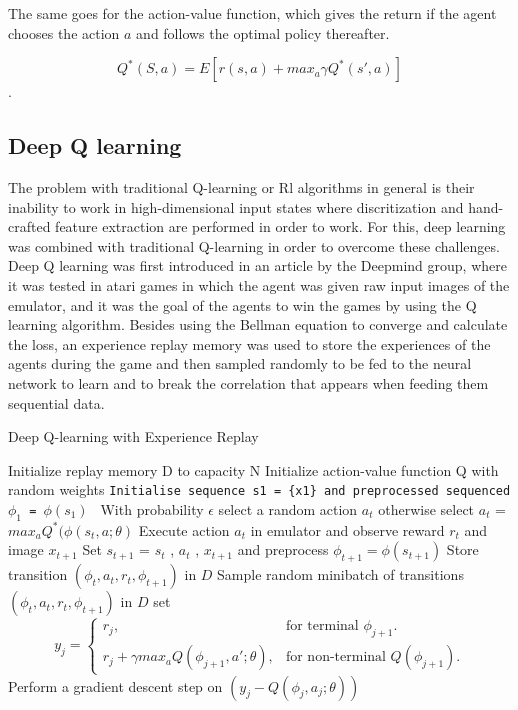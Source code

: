 \documentclass[12pt]{extarticle}
\begin{document}
The same goes for the action-value function, which gives the return if the agent chooses the action $a$ and follows the optimal policy thereafter.

\[ Q^{*}(S,a)=E[r(s,a)+max_{a}\gamma Q^{*}(s',a) ] \]\cite{watkins1992q}.


\pagebreak

\subsection{Deep Q learning}
The problem with traditional Q-learning or Rl algorithms in general is their inability to work in high-dimensional input states where discritization and hand-crafted feature extraction are performed in order to work. For this, deep learning was combined with traditional Q-learning in order to overcome these challenges. \cite{mnih2013playing}
Deep Q learning was first introduced in an article by the Deepmind group, where it was tested in atari games in which the agent was given raw input images of the emulator, and it was the goal of the agents to win the games by using the Q learning algorithm.
Besides using the Bellman equation to converge and calculate the loss, an experience replay memory was used to store the experiences of the agents during the game and then sampled randomly to be fed to the neural network to learn and to break the correlation that appears when feeding them sequential data. \cite{mnih2013playing}  

\begin{algorithm}
\caption{Deep Q-learning with Experience Replay}\label{alg:cap}
\begin{algorithmic}
\State Initialize replay memory D to capacity N
\State Initialize action-value function Q with random weights
        \State \texttt{Initialise sequence s1 = \{x1\} and preprocessed sequenced $\phi_{1}$ = $\phi(s_{1})$  }
         \State With probability $\epsilon$ select a random action $a_{t}$
         \State otherwise select  $a_{t}$ = $max_{a} Q^{*}(\phi(s_{t},a;\theta) $ 
         \State Execute action $a_{t}$ in emulator and observe reward ${r_{t}}$ and image $x_{t+1}$
        \State Set $s_{t+1}$ = $s_{t}$ , $a_{t}$ , $x_{t+1}$ and preprocess  
        $\phi_{t+1}=\phi(s_{t+1})$
        \State Store transition $(\phi_{t} , a_{t} , r_{t} , \phi_{t+1} )$ in $D$
        \State Sample random
minibatch of transitions $(\phi_{t} , a_{t} , r_{t} , \phi_{t+1} )$ in $D$
        \State set  \begin{equation}
  y_{j}=\begin{cases}
    r_{j}, & \text{for terminal $\phi_{j+1} $}.\\
    r_{j}+\gamma max_{a}Q(\phi_{j+1},a';\theta) , & \text{for non-terminal $Q(\phi_{j+1})$}.
  \end{cases}
\end{equation}
        \State Perform a gradient descent step on $(y_{j} - Q(\phi_{j} , a_{j} ; \theta))$ 
        \EndFor 
\EndFor 


\end{algorithmic}
\end{algorithm}
 
\end{document}

